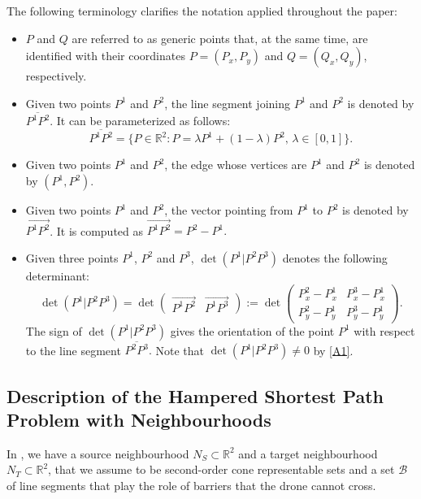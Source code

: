 \documentclass[a4paper,  review, authoryear, 1p.]{elsarticle}
\newcommand{\SPPN}{{\sf{H-SPPN}\xspace }}
\newcommand{\segment}[2]{\overline{#1#2}}
\newcommand{\determinant}[3]{\det({#1|#2#3})}
\begin{document}
		The following terminology clarifies the notation applied throughout the paper: 
		\begin{itemize}
			\item $P$ and $Q$ are referred to as generic points that, at the same time, are identified with their coordinates $P=(P_x, P_y)$ and $Q=(Q_x, Q_y)$, respectively.
			\item Given two points $P^1$ and $P^2$, the line segment joining $P^1$ and $P^2$ is denoted by $\segment{P^1}{P^2}$. It can be parameterized as follows:
			$$\segment{P^1}{P^2}=\{P\in\mathbb R^2:P=\lambda P^1 + (1-\lambda)P^2,\,\lambda\in[0,1]\}.$$
			\item  Given two points $P^1$ and $P^2$, the edge whose vertices are $P^1$ and $P^2$ is denoted by $(P^1, P^2)$.
			\item  Given two points $P^1$ and $P^2$, the vector pointing from $P^1$ to $P^2$ is denoted by $\overrightarrow{P^1P^2}$. It is computed as
			$\overrightarrow{P^1P^2}=P^2-P^1.$
			\item Given three points $P^1$, $P^2$ and $P^3$, $\determinant{P^1}{P^2}{P^3}$ denotes the following determinant:
			$$
			\determinant{P^1}{P^2}{P^3}=\det\left(\begin{array}{c|c} \overrightarrow{P^1P^2} & \overrightarrow{P^1P^3}\end{array}\right):=\det\left( \begin{array}{cc}  P^2_x-P^1_x & P^3_x-P^1_x \\ P_y^2-P^1_y & P_y^3-P_y^1 \end{array}\right).
			$$
			The sign of $\determinant{P^1}{P^2}{P^3}$ gives the orientation of the point $P^1$ with respect to the line segment $\segment{P^2}{P^3}.$ Note that $\determinant{P^1}{P^2}{P^3}\neq 0$ by \ref{A1}. 
		\end{itemize}
		
		
		\subsection{Description of the Hampered Shortest Path Problem with Neighbourhoods}\label{subsection:descriptionHSPPN}
		In \SPPN, we have a source neighbourhood $N_S\subset\mathbb R^2$ and a target neighbourhood $N_T\subset\mathbb R^2$, that we assume to be second-order cone representable sets and a set $\mathcal B$ of line segments that play the role of barriers that the drone cannot cross. 
		
\end{document}
